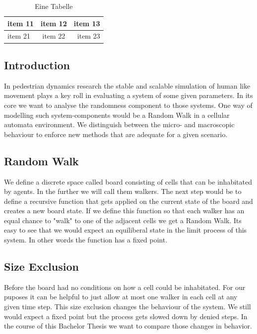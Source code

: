 \begin{table}[h]
    \centering %
    \begin{tabular}{|l|c|r|} %
    \hline %
    item 11 & item 12 & item 13 \\ %
    \hline
    item 21  & item 22  & item 23  \\
    \hline
    \end{tabular}
    \caption{Eine Tabelle}
    \label{tab:tabelle1}
\end{table}

\subsection{Introduction}
In pedestrian dynamics research the stable and scalable simulation of human like movement plays a key roll in evaluating a system of some given parameters.
In its core we want to analyse the randomness component to those systems.
One way of modelling such system-components would be a Random Walk in a cellular automata environment.
We distinguish between the micro- and macroscopic behaviour to enforce new methods that are adequate for a given scenario. 

\subsection{Random Walk}
We define a discrete space called board consisting of cells that can be inhabitated by agents. In the further we will call them walkers.
The next step would be to define a recursive function that gets applied on the current state of the board and creates a new board state.
If we define this function so that each walker has an equal chance to "walk" to one of the adjacent cells we get a Random Walk.
Its easy to see that we would expect an equiliberal state in the limit process of this system. In other words the function has a fixed point.

\subsection{Size Exclusion}
Before the board had no conditions on how a cell could be inhabitated. 
For our puposes it can be helpful to just allow at most one walker in each cell at any given time step.
This size exclusion changes the behaviour of the system. We still would expect a fixed point but the process gets slowed down by denied steps. 
In the course of this Bachelor Thesis we want to compare those changes in behavior.

